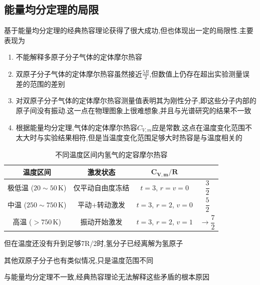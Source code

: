 \documentclass{article}
\begin{document}
\subsection{能量均分定理的局限}

基于能量均分定理的经典热容理论获得了很大成功,但也体现出一定的局限性.主要表现为

\begin{enumerate}
    \item 不能解释多原子分子气体的定体摩尔热容
    \item 双原子分子气体的定体摩尔热容虽然接近$\frac{5R}{2}$,但数值上仍存在超出实验测量误差的范围的差别
    \item 对双原子分子气体的定体摩尔热容测量值表明其为刚性分子,即这些分子内部的原子间没有振动.这一点在物理图象上很难想象,并且与光谱研究的结果不一致
    \item 根据能量均分定理,气体的定体摩尔热容$C_{V,m}$应是常数,这点在温度变化范围不太大时与实验结果相符,但是当温度变化范围足够大时热容是与温度相关的
\end{enumerate}

    
    \begin{table}[htbp]
    \centering
    \caption{不同温度区间内氢气的定容摩尔热容}
    \label{tab:h2_cv_temp}
    \renewcommand{\arraystretch}{1.8}
    \begin{tabular}{c c c c}
    \toprule %
    \textbf{温度区间} & \textbf{激发状态} & $\boldsymbol{C_{V,m}/R}$ \\
    \midrule %
    
    极低温 ($20 \sim 50\,\text{K}$) & 仅平动自由度冻结 & $t=3$, $r=v=0$ & $\dfrac{3}{2}$ \\
    
    中温 ($250 \sim 750\,\text{K}$)   & 平动+转动激发  & $t=3$, $r=2$, $v=0$   & $\dfrac{5}{2}$ \\
    
    高温 ($> 750\,\text{K}$)        & 振动开始激发  &$t=3$, $r=2$, $v=1$   & $\to \dfrac{7}{2}$ \\
    
    \bottomrule %
    \end{tabular}
    \end{table}

    但在温度还没有升到足够7R/2时,氢分子已经离解为氢原子

    其他双原子分子也有类似情况,只是温度范围不同



与能量均分定理不一致,经典热容理论无法解释这些矛盾的根本原因
\end{document}
